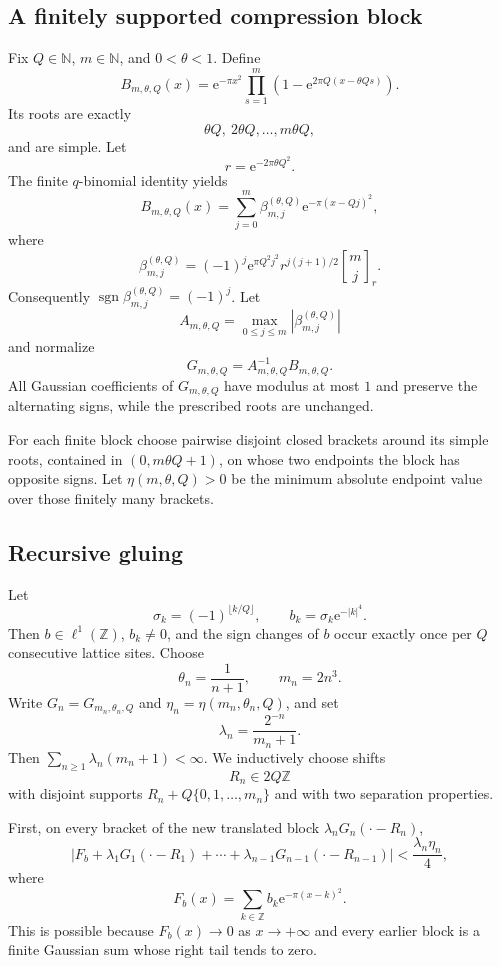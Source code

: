 \documentclass[11pt]{article}
\newcommand{\Z}{\mathbb{Z}}
\newcommand{\N}{\mathbb{N}}
\newcommand{\e}{\mathrm{e}}
\newcommand{\sgn}{\operatorname{sgn}}
\begin{document}
\subsection{A finitely supported compression block}
Fix $Q\in\N$, $m\in\N$, and $0<\theta<1$. Define
\begin{equation}\label{eq:compression-block}
 B_{m,\theta,Q}(x)=\e^{-\pi x^2}
 \prod_{s=1}^{m}\left(1-\e^{2\pi Q(x-\theta Qs)}\right).
\end{equation}
Its roots are exactly
\[
 \theta Q,\ 2\theta Q,\ldots,m\theta Q,
\]
and are simple. Let
\[
 r=\e^{-2\pi\theta Q^2}.
\]
The finite $q$-binomial identity yields
\begin{equation}\label{eq:compression-expansion}
 B_{m,\theta,Q}(x)=\sum_{j=0}^{m}
 \beta^{(\theta,Q)}_{m,j}\e^{-\pi(x-Qj)^2},
\end{equation}
where
\begin{equation}\label{eq:compression-beta}
 \beta^{(\theta,Q)}_{m,j}
 =(-1)^j\e^{\pi Q^2j^2}r^{j(j+1)/2}
 \genfrac{[}{]}{0pt}{}{m}{j}_{r}.
\end{equation}
Consequently $\sgn\beta^{(\theta,Q)}_{m,j}=(-1)^j$. Let
\[
 A_{m,\theta,Q}=\max_{0\le j\le m}
 \left|\beta^{(\theta,Q)}_{m,j}\right|
\]
and normalize
\[
 G_{m,\theta,Q}=A_{m,\theta,Q}^{-1}B_{m,\theta,Q}.
\]
All Gaussian coefficients of $G_{m,\theta,Q}$ have modulus at most $1$ and preserve the alternating signs, while the prescribed roots are unchanged.

For each finite block choose pairwise disjoint closed brackets around its simple roots, contained in $(0,m\theta Q+1)$, on whose two endpoints the block has opposite signs. Let $\eta(m,\theta,Q)>0$ be the minimum absolute endpoint value over those finitely many brackets.

\subsection{Recursive gluing}
Let
\[
 \sigma_k=(-1)^{\lfloor k/Q\rfloor},\qquad
 b_k=\sigma_k\e^{-|k|^4}.
\]
Then $b\in\ell^1(\Z)$, $b_k\neq0$, and the sign changes of $b$ occur exactly once per $Q$ consecutive lattice sites. Choose
\[
 \theta_n=\frac1{n+1},\qquad m_n=2n^3.
\]
Write $G_n=G_{m_n,\theta_n,Q}$ and $\eta_n=\eta(m_n,\theta_n,Q)$, and set
\[
 \lambda_n=\frac{2^{-n}}{m_n+1}.
\]
Then $\sum_{n\ge1}\lambda_n(m_n+1)<\infty$. We inductively choose shifts
\[
 R_n\in2Q\Z
\]
with disjoint supports $R_n+Q\{0,1,\ldots,m_n\}$ and with two separation properties.

First, on every bracket of the new translated block $\lambda_nG_n(\cdot-R_n)$,
\begin{equation}\label{eq:new-block-separation}
 |F_b+\lambda_1G_1(\cdot-R_1)+\cdots+\lambda_{n-1}G_{n-1}(\cdot-R_{n-1})|
 <\frac{\lambda_n\eta_n}{4},
\end{equation}
where
\[
 F_b(x)=\sum_{k\in\Z}b_k\e^{-\pi(x-k)^2}.
\]
This is possible because $F_b(x)\to0$ as $x\to+\infty$ and every earlier block is a finite Gaussian sum whose right tail tends to zero.
\end{document}
